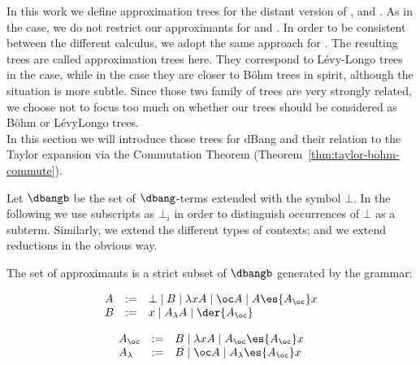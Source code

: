 In this work we define approximation trees for the distant version of \cbv{}, \cbn{} and \bang. As in the \cbv{} case, we do not restrict our approximants for \dcbn{} and \dcbv{}. In order to be consistent between the different calculus, we adopt the same approach for \dcbn{}. The resulting trees are called approximation trees here. They correspond to Lévy-Longo trees in the \dcbn{} case, while in the \dcbv{} case they are closer to Böhm trees in spirit, although the situation is more subtle. Since those two family of trees are very strongly related, we choose not to focus too much on whether our trees should be considered as Böhm or Lévy\nativeendash{}Longo trees.\\


In this section we will introduce those trees for dBang and their relation to the Taylor expansion via the Commutation Theorem (Theorem~\ref{thm:taylor-bohm-commute}). 



\begin{definition}[$\dbangb$]
	Let $\dbangb$ be the set of $\dbang$-terms extended with the symbol $\bot$.
	In the following we use subscripts as $\bot_i$ in order to distinguish
	occurrences of $\bot$ as a subterm.
	Similarly, we extend the different types of contexts; and
	we extend reductions in the obvious way.
\end{definition}
\begin{definition}\label{def:bohm_approx}
	The set of approximants is a strict subset of $\dbangb$  generated by the grammar:
\begin{minipage}{0.49\textwidth}
	$$\begin{array}{lll}
	A&:= & \bot\mid B\mid \lambda xA\mid \oc A\mid A\es{A_\oc }x\\
	B&:=& x\mid A_\lambda A\mid \der{A_\oc}\\
	\end{array}$$
\end{minipage}
%
\begin{minipage}{0.49\textwidth}
	$$\begin{array}{lll}
	A_\oc &:= & B \mid \lambda x A \mid A_\oc \es{A_\oc}x\\
	A_\lambda &:= &B \mid \oc A\mid A_\lambda \es{A_\oc}x\\
	\end{array}$$
\end{minipage}
\end{definition}

